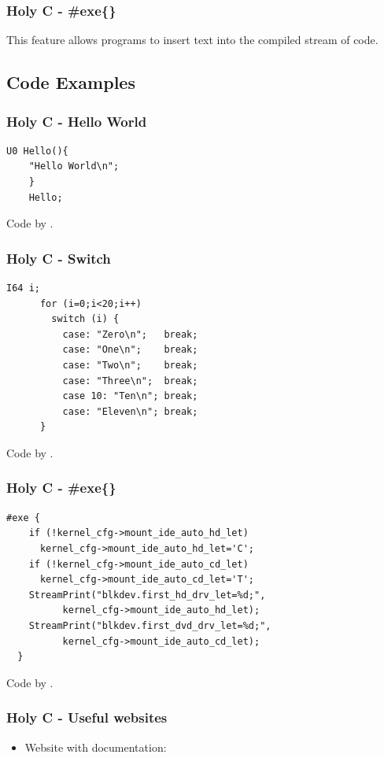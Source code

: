 \documentclass{beamer}
\begin{document}
	\begin{frame}[fragile]
		\frametitle{Holy C - \#exe\{\}}
		This feature allows programs to insert text into the compiled stream of code.
	\end{frame}

	\subsection{Code Examples}
	{
	\begin{frame}[fragile]
		\frametitle{Holy C - Hello World}
		\begin{lstlisting}[language=HolyC]
    U0 Hello(){
    "Hello World\n";  
    }
    Hello;
\end{lstlisting}

		Code by \cite{barretone_barrettottetempleos-and-holyc_2018}.
	\end{frame}

	\begin{frame}[fragile]
		\frametitle{Holy C - Switch}
		\begin{lstlisting}[language=HolyC]
    I64 i;
      for (i=0;i<20;i++) 
        switch (i) {
          case: "Zero\n";   break; 
          case: "One\n";    break; 
          case: "Two\n";    break;
          case: "Three\n";  break;
          case 10: "Ten\n"; break;
          case: "Eleven\n"; break; 
      }
\end{lstlisting}

		Code by \cite{zealos_zeal-operating-systemzealos_2025}.
	\end{frame}

	\begin{frame}[fragile]
		\frametitle{Holy C - \#exe\{\}}
		\begin{lstlisting}[language=HolyC]
    #exe {
    if (!kernel_cfg->mount_ide_auto_hd_let)
      kernel_cfg->mount_ide_auto_hd_let='C';
    if (!kernel_cfg->mount_ide_auto_cd_let)
      kernel_cfg->mount_ide_auto_cd_let='T';
    StreamPrint("blkdev.first_hd_drv_let=%d;",
          kernel_cfg->mount_ide_auto_hd_let);
    StreamPrint("blkdev.first_dvd_drv_let=%d;",
          kernel_cfg->mount_ide_auto_cd_let);
  }
\end{lstlisting}

		Code by \cite{davis_terry_2017}.
	\end{frame}

	\begin{frame}
		\frametitle{Holy C - Useful websites}
		\begin{itemize}
			\item Website with documentation:


\end{itemize}
\end{frame}}
\end{document}
